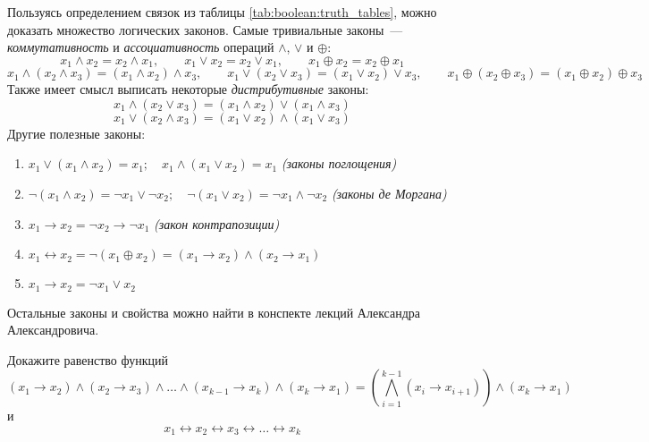 Пользуясь определением связок из таблицы \ref{tab:boolean:truth_tables}, можно доказать множество логических законов. %
Самые тривиальные законы~--- \textit{коммутативность} и \textit{ассоциативность} операций $ \wedge $, $ \vee $ и $ \oplus $:
\[
    x_1 \wedge x_2 = x_2 \wedge x_1, \qquad
    x_1 \vee x_2   = x_2 \vee x_1, \qquad
    x_1 \oplus x_2 = x_2 \oplus x_1
\]
\[
    x_1 \wedge (x_2 \wedge x_3) = (x_1 \wedge x_2) \wedge x_3, \qquad
    x_1 \vee (x_2 \vee x_3)     = (x_1 \vee x_2) \vee x_3, \qquad
    x_1 \oplus (x_2 \oplus x_3) = (x_1 \oplus x_2) \oplus x_3
\]
Также имеет смысл выписать некоторые \textit{дистрибутивные} законы:
\[
    x_1 \wedge (x_2 \vee x_3) = (x_1 \wedge x_2) \vee (x_1 \wedge x_3)
\]
\[
    x_1 \vee (x_2 \wedge x_3) = (x_1 \vee x_2) \wedge (x_1 \vee x_3)
\]
Другие полезные законы:
\begin{enumerate}[label=\arabic*)]
    \item $ x_1 \vee (x_1 \wedge x_2) = x_1; \quad x_1 \wedge (x_1 \vee x_2) = x_1 $ \hspace*{\fill} \textit{(законы поглощения)}
    \item $ \neg (x_1 \wedge x_2) = \neg x_1 \vee \neg x_2; \quad \neg (x_1 \vee x_2) = \neg x_1 \wedge \neg x_2 $ \hspace*{\fill} \textit{(законы де Моргана)}
    \item $ x_1 \rightarrow x_2 = \neg x_2 \rightarrow \neg x_1 $ \hspace*{\fill} \textit{(закон контрапозиции)}
    \item $ x_1 \leftrightarrow x_2 = \neg (x_1 \oplus x_2) = (x_1 \rightarrow x_2) \wedge (x_2 \rightarrow x_1) $
    \item $ x_1 \to x_2 = \neg x_1 \vee x_2 $
\end{enumerate}
Остальные законы и свойства можно найти в конспекте лекций Александра Александровича.

\begin{Exercise}[counter=SecExercise, label={ex:boolean:chain}]
    \noindent
    Докажите равенство функций
    \[
        (x_1 \rightarrow x_2) \wedge (x_2 \rightarrow x_3) \wedge \ldots \wedge (x_{k-1} \rightarrow x_k) \wedge (x_k \rightarrow x_1) =
        \left( \bigwedge_{i=1}^{k-1} (x_i \rightarrow x_{i+1}) \right) \wedge (x_k \rightarrow x_1)
    \]
    и
    \[
        x_1 \leftrightarrow x_2 \leftrightarrow x_3 \leftrightarrow \ldots \leftrightarrow x_k
    \]
\end{Exercise}

